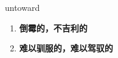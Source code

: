 
\begin{frame}
{\huge untoward}
\begin{center}
\begin{enumerate}\Large
  \item \textbf{倒霉的，不吉利的}
  \item \textbf{难以驯服的，难以驾驭的}
\end{enumerate}
\end{center}
\end{frame}
